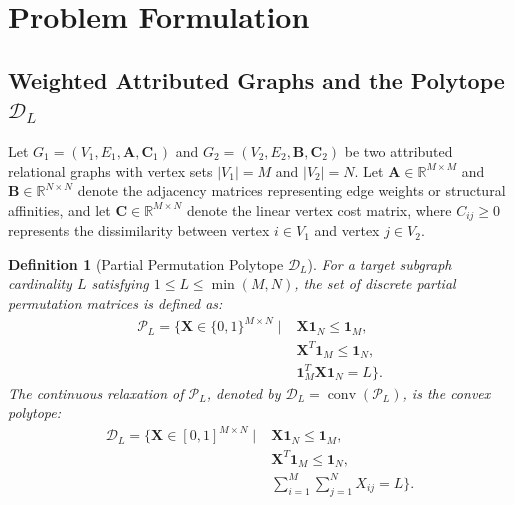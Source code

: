 \documentclass[a4paper,fleqn]{cas-dc}
\theoremstyle{thmstyleone}
\theoremstyle{thmstyletwo}
\theoremstyle{thmstylethree}
\newtheorem{definition}{Definition}
\begin{document}
\section{Problem Formulation}
\label{sec:formulation}

\subsection{Weighted Attributed Graphs and the Polytope $\mathcal{D}_L$}
Let $G_1 = (V_1, E_1, \mathbf{A}, \mathbf{C}_1)$ and $G_2 = (V_2, E_2, \mathbf{B}, \mathbf{C}_2)$ be two attributed relational graphs with vertex sets $|V_1| = M$ and $|V_2| = N$. Let $\mathbf{A} \in \mathbb{R}^{M \times M}$ and $\mathbf{B} \in \mathbb{R}^{N \times N}$ denote the adjacency matrices representing edge weights or structural affinities, and let $\mathbf{C} \in \mathbb{R}^{M \times N}$ denote the linear vertex cost matrix, where $C_{ij} \ge 0$ represents the dissimilarity between vertex $i \in V_1$ and vertex $j \in V_2$.

\begin{definition}[Partial Permutation Polytope $\mathcal{D}_L$]
For a target subgraph cardinality $L$ satisfying $1 \le L \le \min(M, N)$, the set of discrete partial permutation matrices is defined as:
\begin{align}
\mathcal{P}_L = \Big\{ \mathbf{X} \in \{0, 1\}^{M \times N} \;\Big|\;& \mathbf{X}\mathbf{1}_N \le \mathbf{1}_M, \nonumber \\
& \mathbf{X}^T\mathbf{1}_M \le \mathbf{1}_N, \nonumber \\
& \mathbf{1}_M^T\mathbf{X}\mathbf{1}_N = L \Big\}.
\label{eq:PL}
\end{align}
The continuous relaxation of $\mathcal{P}_L$, denoted by $\mathcal{D}_L = \operatorname{conv}(\mathcal{P}_L)$, is the convex polytope:
\begin{align}
\mathcal{D}_L = \Big\{ \mathbf{X} \in [0, 1]^{M \times N} \;\Big|\;& \mathbf{X}\mathbf{1}_N \le \mathbf{1}_M, \nonumber \\
& \mathbf{X}^T\mathbf{1}_M \le \mathbf{1}_N, \nonumber \\
& \sum_{i=1}^M \sum_{j=1}^N X_{ij} = L \Big\}.
\label{eq:DL}
\end{align}
\end{definition}
\end{document}
